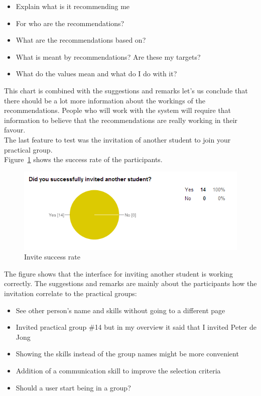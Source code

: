 \begin{itemize}
\item Explain what is it recommending me
\item For who are the recommendations?
\item What are the recommendations based on?
\item What is meant by recommendations? Are these my targets?
\item What do the values mean and what do I do with it?
\end{itemize}
This chart is combined with the suggestions and remarks let's us conclude that there should be a lot more information about the workings of the recommendations.
People who will work with the system will require that information to believe that the recommendations are really working in their favour.\\

The last feature to test was the invitation of another student to join your practical group.\\
Figure~\ref{invite_chart} shows the success rate of the participants.
\begin{figure}[H]
    \centering
    \includegraphics[width=\textwidth]{images/invite_chart}
    \caption{Invite success rate}
    \label{invite_chart}
\end{figure}

The figure shows that the interface for inviting another student is working correctly.
The suggestions and remarks are mainly about the participants how the invitation correlate to the practical groups:
\begin{itemize}
\item See other person's name and skills without going to a different page
\item Invited practical group $\#$14 but in my overview it said that I invited Peter de Jong
\item Showing the skills instead of the group names might be more convenient
\item Addition of a communication skill to improve the selection criteria
\item Should a user start being in a group?
\end{itemize}

